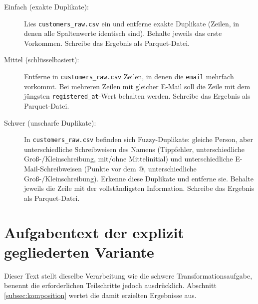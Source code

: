 \begin{description}
    \item[Einfach (exakte Duplikate):] Lies \texttt{customers\_raw.csv} ein und
    entferne exakte Duplikate (Zeilen, in denen alle Spaltenwerte identisch
    sind). Behalte jeweils das erste Vorkommen. Schreibe das Ergebnis als
    Parquet-Datei.

    \item[Mittel (schlüsselbasiert):] Entferne in \texttt{customers\_raw.csv}
    Zeilen, in denen die \texttt{email} mehrfach vorkommt. Bei mehreren Zeilen
    mit gleicher E-Mail soll die Zeile mit dem jüngsten
    \texttt{registered\_at}-Wert behalten werden. Schreibe das Ergebnis als
    Parquet-Datei.

    \item[Schwer (unscharfe Duplikate):] In \texttt{customers\_raw.csv} befinden
    sich Fuzzy-Duplikate: gleiche Person, aber unterschiedliche Schreibweisen
    des Namens (Tippfehler, unterschiedliche Groß-/Kleinschreibung, mit/ohne
    Mittelinitial) und unterschiedliche E-Mail-Schreibweisen (Punkte vor dem @,
    unterschiedliche Groß-/Kleinschreibung). Erkenne diese Duplikate und
    entferne sie. Behalte jeweils die Zeile mit der vollständigsten Information.
    Schreibe das Ergebnis als Parquet-Datei.
\end{description}


\section{Aufgabentext der explizit gegliederten Variante}
\label{apx:komposition}

Dieser Text stellt dieselbe Verarbeitung wie die schwere Transformationsaufgabe,
benennt die erforderlichen Teilschritte jedoch ausdrücklich. Abschnitt
\ref{subsec:komposition} wertet die damit erzielten Ergebnisse aus.

